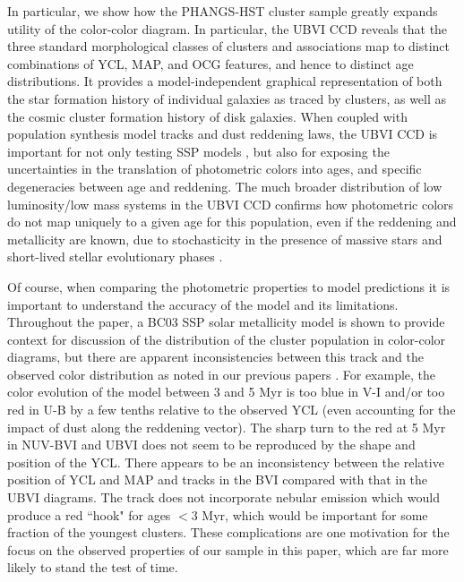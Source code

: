 \documentclass[]{aastex631}
\begin{document}
In particular, we show how the PHANGS-HST cluster sample greatly expands utility of the color-color diagram.  In particular, the UBVI CCD reveals that the three standard morphological classes of clusters and associations map to distinct combinations of YCL, MAP, and OCG features, and hence to distinct age distributions.  It provides a model-independent graphical representation of both the star formation history of individual galaxies as traced by clusters, as well as the cosmic cluster formation history of disk galaxies.  When coupled with population synthesis model tracks and dust reddening laws, the UBVI CCD is important for not only testing SSP models \citep[e.g.,][]{larsen_young_1999, bruzual_stellar_2003, vazquez_optimization_2005, maraston_evolutionary_1998}, but also for exposing the uncertainties in the translation of photometric colors into ages, and specific degeneracies between age and reddening.  The much broader distribution of low luminosity/low mass systems in the UBVI CCD confirms how photometric colors do not map uniquely to a given age for this population, even if the reddening and metallicity are known, due to stochasticity in the presence of massive stars and short-lived stellar evolutionary phases \citep[e.g.][]{fouesneau_accounting_2010, silva-villa_star_2011,de_meulenaer_deriving_2013,krumholz_star_2015, OD2022}.

 Of course, when comparing the photometric properties to model predictions it is important to understand the accuracy of the model and its limitations. Throughout the paper, a BC03 SSP solar metallicity model is shown to provide context for discussion of the distribution of the cluster population in color-color diagrams, but there are apparent inconsistencies between this track and the observed color distribution as noted in our previous papers \citep[e.g.,][]{turner_phangs-hst_2021, deger_bright_2022}.  For example, the color evolution of the model between 3 and 5 Myr is too blue in V-I and/or too red in U-B by a few tenths relative to the observed YCL (even accounting for the impact of dust along the reddening vector).  The sharp turn to the red at 5 Myr in NUV-BVI and UBVI does not seem to be reproduced by the shape and position of the YCL.   There appears to be an inconsistency between the relative position of YCL and MAP and tracks in the BVI compared with that in the UBVI diagrams.  The track does not incorporate nebular emission which would produce a red ``hook" for ages $<$3 Myr, which would be important for some fraction of the youngest clusters.  These complications are one motivation for the focus on the observed properties of our sample in this paper, which are far more likely to stand the test of time.
\end{document}
